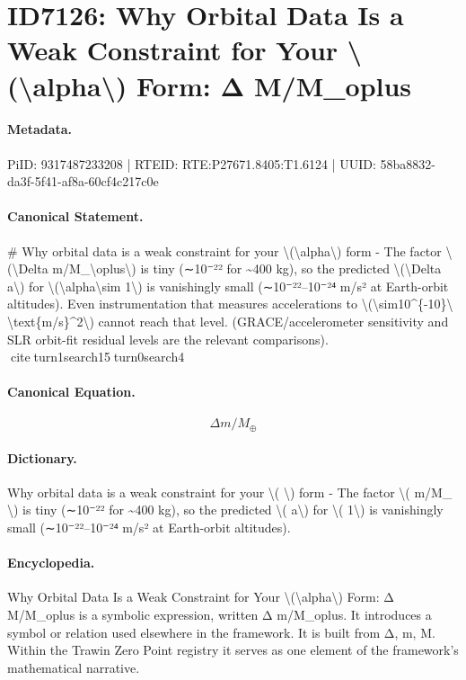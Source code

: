 \section*{ID7126: Why Orbital Data Is a Weak Constraint for Your \textbackslash{}(\textbackslash{}alpha\textbackslash{}) Form: Δ M/M\_oplus}
\paragraph{Metadata.}
PiID: 9317487233208 | RTEID: RTE:P27671.8405:T1.6124 | UUID: 58ba8832-da3f-5f41-af8a-60cf4c217c0e

\paragraph{Canonical Statement.}
\# Why orbital data is a weak constraint for your \textbackslash{}(\textbackslash{}alpha\textbackslash{}) form - The factor \textbackslash{}(\textbackslash{}Delta m/M\_\textbackslash{}oplus\textbackslash{}) is tiny (∼10⁻²² for \textasciitilde{}400 kg), so the predicted \textbackslash{}(\textbackslash{}Delta a\textbackslash{}) for \textbackslash{}(\textbackslash{}alpha\textbackslash{}sim 1\textbackslash{}) is vanishingly small (∼10⁻²²–10⁻²⁴ m/s² at Earth-orbit altitudes). Even instrumentation that measures accelerations to \textbackslash{}(\textbackslash{}sim10\textasciicircum{}\{-10\}\textbackslash{} \textbackslash{}text\{m/s\}\textasciicircum{}2\textbackslash{}) cannot reach that level. (GRACE/accelerometer sensitivity and SLR orbit-fit residual levels are the relevant comparisons). citeturn1search15turn0search4

\paragraph{Canonical Equation.}
\[
\Delta m/M_\oplus
\]

\paragraph{Dictionary.}
Why orbital data is a weak constraint for your \textbackslash{}( \textbackslash{}) form - The factor \textbackslash{}( m/M\_ \textbackslash{}) is tiny (∼10⁻²² for \textasciitilde{}400 kg), so the predicted \textbackslash{}( a\textbackslash{}) for \textbackslash{}( 1\textbackslash{}) is vanishingly small (∼10⁻²²–10⁻²⁴ m/s² at Earth-orbit altitudes).

\paragraph{Encyclopedia.}
Why Orbital Data Is a Weak Constraint for Your \textbackslash{}(\textbackslash{}alpha\textbackslash{}) Form: Δ M/M\_oplus is a symbolic expression, written Δ m/M\_oplus. It introduces a symbol or relation used elsewhere in the framework. It is built from Δ, m, M. Within the Trawin Zero Point registry it serves as one element of the framework's mathematical narrative.
